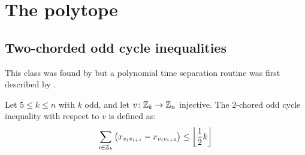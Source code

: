 \section{The \CP polytope}\label{sec:cpp}

\subsection{Two-chorded odd cycle inequalities}
This class was found by \cite{grotschelFacetsCliquePartitioning1990} but a polynomial time separation routine was first described by \cite{mullerPartialOrderPolytope1996}.

\begin{definition}\label{def:2-chords}
	Let $5 \leq k \leq n$ with $k$ odd, and let $v\colon \mathbb{Z}_k \to \mathbb{Z}_n$ injective.
	The $2$-chored odd cycle inequality with respect to $v$ is defined as:
	\begin{equation}\label{eq:2-chords}
		\sum_{i \in \mathbb{Z}_k} \left( x_{v_i v_{i+1}} - x_{v_i v_{i+2}} \right) \leq \left\lfloor \frac{1}{2} k \right\rfloor
	\end{equation}
\end{definition}

